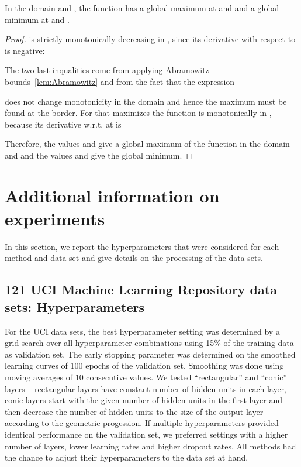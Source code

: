 \documentclass{article}
\begin{document}
\begin{lemma}
\label{lem:mainsubfunctionJ11J12}
In the domain  and , 
the function  has a global 
maximum at  and  and a global minimum at  and . 
\end{lemma}

\begin{proof}
 is strictly monotonically decreasing
in , since its derivative with respect to  is negative:

The two last inqualities come from applying Abramowitz bounds~\ref{lem:Abramowitz} and from the fact that the expression

does not change monotonicity in the 
domain and hence the maximum must be found at the border. For  that maximizes the function  is monotonically   in , because 
its derivative w.r.t.  at  is 

Therefore, the values  and  give
a global maximum of the function  in the domain  and  and
the values  and  give the global minimum.
\end{proof}



\section{Additional information on experiments}
\label{sec:experiments} 
In this section, we report the hyperparameters that were considered for each method and
data set and give details on the processing of the data sets.

\subsection{121 UCI Machine Learning Repository data sets: Hyperparameters} 
For the UCI data sets, the best hyperparameter setting was determined by a grid-search over all
hyperparameter combinations using 15\% of the training data as validation set.
The early stopping parameter was determined on the smoothed learning curves of 100 epochs
of the validation set. Smoothing was done using moving averages of 10 consecutive 
values. We tested ``rectangular'' and ``conic'' layers -- rectangular layers have 
constant number of hidden units in each layer, conic layers start with the given 
number of hidden units in the first layer and then decrease the number of hidden units
to the size of the output layer according to the geometric progession.
If multiple hyperparameters provided identical performance on the validation 
set, we preferred settings with a higher number of layers, lower learning rates and higher dropout rates. 
All methods had the chance to adjust their hyperparameters to the data set at hand. 
\end{document}
